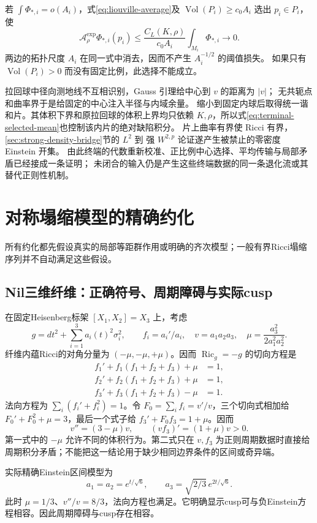 \documentclass[UTF8,a4paper,11pt,fontset=fandol]{ctexart}
\numberwithin{equation}{section}
\theoremstyle{definition}
\newcommand{\Ric}{\operatorname{Ric}}
\newcommand{\Vol}{\operatorname{Vol}}
\begin{document}
若 $\int\Phi_{*,i}=o(A_i)$，式\eqref{eq:liouville-average}及
$\Vol(P_i)\ge c_0A_i$ 选出 $p_i\in P_i$，使
\begin{equation}\label{eq:terminal-selected-mean}
\mathcal A_\rho^{\exp}\Phi_{*,i}(p_i)
\le\frac{C_L(K,\rho)}{c_0A_i}\int_{M_i}\Phi_{*,i}\longrightarrow0.
\end{equation}
两边的拓扑尺度 $A_i$ 在同一式中消去，因而不产生 $A_i^{-1/2}$ 的阈值损失。
如果只有 $\Vol(P_i)>0$ 而没有固定比例，此选择不能成立。

拉回球中径向测地线不互相识别，Gauss 引理给中心到 $v$ 的距离为 $|v|$；
无共轭点和曲率界于是给固定的中心注入半径与内域余量。
缩小到固定内球后取得统一谐和片。其体积下界和原拉回球的体积上界均只依赖
$K,\rho$，所以式\eqref{eq:terminal-selected-mean}也控制该内片的绝对缺陷积分。
片上曲率有界使 Ricci 有界，\ref{sec:strong-density-bridge}节的 $L^2$ 到
强 $W^{2,p}$ 论证遂产生被禁止的零密度 Einstein 开集。
由此终端的代数重新校准、正比例中心选择、平均传输与局部矛盾已经接成一条证明；
未闭合的输入仍是产生这些终端数据的同一条退化流或其替代正则性机制。

\section{对称塌缩模型的精确约化}\label{app:reduction}
所有约化都先假设真实的局部等距群作用或明确的齐次模型；一般有界Ricci塌缩序列并不自动满足这些假设。

\subsection{Nil三维纤维：正确符号、周期障碍与实际cusp}
在固定Heisenberg标架 $[X_1,X_2]=X_3$ 上，考虑
\[
g=dt^2+\sum_{i=1}^3 a_i(t)^2\sigma_i^2,\qquad
f_i=a_i'/a_i,\quad v=a_1a_2a_3,\quad
\mu=\frac{a_3^2}{2a_1^2a_2^2}.
\]
纤维内蕴Ricci的对角分量为 $(-\mu,-\mu,+\mu)$。因而 $\Ric_g=-g$ 的切向方程是
\begin{align*}
f_1'+f_1(f_1+f_2+f_3)+\mu&=1,\\
f_2'+f_2(f_1+f_2+f_3)+\mu&=1,\\
f_3'+f_3(f_1+f_2+f_3)-\mu&=1.
\end{align*}
法向方程为 $\sum_i(f_i'+f_i^2)=1$。令 $F_0=\sum_i f_i=v'/v$，三个切向式相加给 $F_0'+F_0^2+\mu=3$，最后一个式子给 $f_3'+F_0f_3=1+\mu$。因而
\[
\boxed{v''=(3-\mu)v,}\qquad
\boxed{(vf_3)'=(1+\mu)v>0.}
\]
第一式中的 $-\mu$ 允许不同的体积行为。第二式只在 $v,f_3$ 为正则周期数据时直接给周期积分矛盾；不能把这一结论用于缺少相同边界条件的区间或奇异端。

实际精确Einstein区间模型为
\[
a_1=a_2=e^{t/\sqrt6},\qquad
a_3=\sqrt{2/3}\,e^{2t/\sqrt6}.
\]
此时 $\mu=1/3$、$v''/v=8/3$，法向方程也满足。它明确显示cusp可与负Einstein方程相容。因此周期障碍与cusp存在相容。
\end{document}
